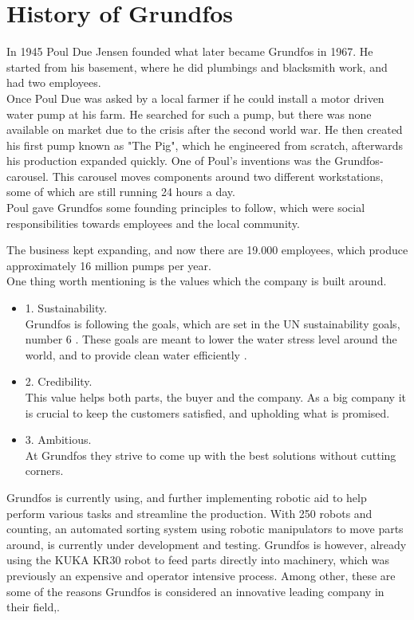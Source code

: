 \section{History of Grundfos} \label{ch:History of Grundfos}

In 1945 Poul Due Jensen founded what later became Grundfos in 1967. He started from his basement, where he did plumbings and blacksmith work, and had two employees\cite{documentray}.\\

Once Poul Due was asked by a local farmer if he could install a motor driven water pump at his farm. He searched for such a pump, but there was none available on market due to the crisis after the second world war. 
He then created his first pump known as "The Pig", which he engineered from scratch, afterwards his production expanded quickly. 
One of Poul's inventions was the Grundfos-carousel. This carousel moves components around two different workstations, some of which are still running 24 hours a day\cite{documentray}.\\

Poul gave Grundfos some founding principles to follow, which were social responsibilities towards employees and the local community.

The business kept expanding, and now there are 19.000 employees, which produce approximately 16 million pumps per year\cite{1Grundfos}.\\

One thing worth mentioning is the values which the company is built around.\\

\begin{itemize}
   
\item 1. Sustainability.\\ Grundfos is following the goals, which are set in the UN sustainability goals, number 6 \cite{Ggoal6}. These goals are meant to lower the water stress level around the world, and to provide clean water efficiently \cite{goal6}.\\
\item 2. Credibility.\\ This value helps both parts, the buyer and the company. As a big company it is crucial to keep the customers satisfied, and upholding what is promised.\\
\item 3. Ambitious.\\ At Grundfos they strive to come up with the best solutions without cutting corners.\\
\end{itemize}
Grundfos is currently using, and further implementing robotic aid to help perform various tasks and streamline the production. With 250 robots and counting, an automated sorting system using robotic manipulators to move parts around, is currently under development and testing. Grundfos is however, already using the KUKA KR30 robot to feed parts directly into machinery, which was previously an expensive and operator intensive process. Among other, these are some of the reasons Grundfos is considered an innovative leading company in their field\cite{1Grundfos},\cite{Grundfosrobot}. 

